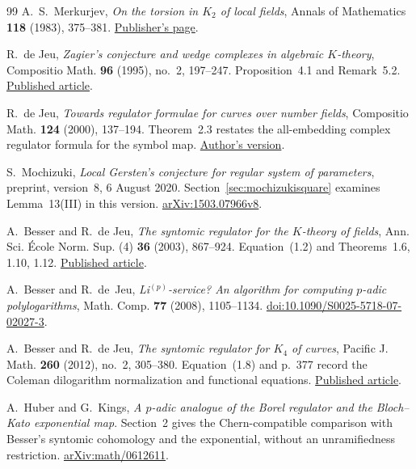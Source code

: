 \documentclass[11pt,a4paper]{article}
\theoremstyle{remark}
\begin{document}
\begin{thebibliography}{99}
A.~S.~Merkurjev, \emph{On the torsion in $K_2$ of local fields}, Annals of Mathematics \textbf{118} (1983), 375--381.
\href{https://annals.math.princeton.edu/1983/118-2/p06}{Publisher's page}.

R.~de Jeu, \emph{Zagier's conjecture and wedge complexes in algebraic $K$-theory}, Compositio Math. \textbf{96} (1995), no.~2, 197--247. Proposition~4.1 and Remark~5.2.
\href{https://www.numdam.org/article/CM_1995__96_2_197_0.pdf}{Published article}.

R.~de Jeu, \emph{Towards regulator formulae for curves over number fields}, Compositio Math. \textbf{124} (2000), 137--194. Theorem~2.3 restates the all-embedding complex regulator formula for the symbol map.
\href{https://arxiv.org/abs/math/9811192}{Author's version}.

S.~Mochizuki, \emph{Local Gersten's conjecture for regular system of parameters}, preprint, version~8, 6 August 2020. Section~\ref{sec:mochizukisquare} examines Lemma~13(III) in this version.
\href{https://arxiv.org/abs/1503.07966v8}{arXiv:1503.07966v8}.

A.~Besser and R.~de Jeu, \emph{The syntomic regulator for the $K$-theory of fields}, Ann. Sci. \'Ecole Norm. Sup. (4) \textbf{36} (2003), 867--924. Equation~(1.2) and Theorems~1.6, 1.10, 1.12.
\href{https://www.numdam.org/article/ASENS_2003_4_36_6_867_0.pdf}{Published article}.

A.~Besser and R.~de~Jeu, \emph{Li$^{(p)}$-service? An algorithm for computing $p$-adic polylogarithms}, Math. Comp. \textbf{77} (2008), 1105--1134. \href{https://doi.org/10.1090/S0025-5718-07-02027-3}{doi:10.1090/S0025-5718-07-02027-3}.

A.~Besser and R.~de Jeu, \emph{The syntomic regulator for $K_4$ of curves}, Pacific J. Math. \textbf{260} (2012), no.~2, 305--380. Equation~(1.8) and p.~377 record the Coleman dilogarithm normalization and functional equations.
\href{https://msp.org/pjm/2012/260-2/pjm-v260-n2-p03-s.pdf}{Published article}.

A.~Huber and G.~Kings, \emph{A $p$-adic analogue of the Borel regulator and the Bloch--Kato exponential map}. Section~2 gives the Chern-compatible comparison with Besser's syntomic cohomology and the exponential, without an unramifiedness restriction.
\href{https://arxiv.org/abs/math/0612611}{arXiv:math/0612611}.


\end{thebibliography}
\end{document}
